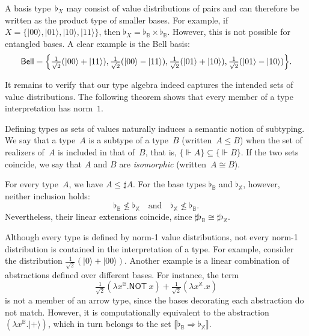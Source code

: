 \documentclass[runningheads,orivec,envcountsame,envcountsect]{llncs}
\providecommand{\qed}{\hbox{\rule{1ex}{1ex}}}%
\newcommand\ket[1]{\ensuremath{|#1\rangle}}
\def\Sph{\mathcal{S}_1}       %
\def\Lam#1#2#3{\lambda#1^{#2}{.}#3} %
\def\Arr{\Rightarrow}
\def\sem#1{\llbracket#1\rrbracket}
\def\real{\Vdash}
\newcommand\B{\mathbb B}
\newcommand\XB{\mathbb X}
\newcommand{\pauliX}[1]{\mathsf{NOT}\ #1}
\newcommand\basis[1]{\ensuremath{\flat_{#1}}}
\begin{document}
\begin{remark}
  A basis type~$\basis{X}$ may consist of value distributions of pairs and can
  therefore be written as the product type of smaller bases. For example, if
  $X=\{\ket{00},\ket{01},\ket{10},\ket{11}\}$, then $\basis{X}=\basis{\B}\times\basis{\B}$.
  However, this is not possible for entangled bases. A clear example is the
  Bell basis:
  \[
    \mathsf{Bell}
    =\Bigl\{
      \tfrac{1}{\sqrt{2}}(\ket{00}+\ket{11}),
      \tfrac{1}{\sqrt{2}}(\ket{00}-\ket{11}),
      \tfrac{1}{\sqrt{2}}(\ket{01}+\ket{10}),
      \tfrac{1}{\sqrt{2}}(\ket{01}-\ket{10})
    \Bigr\}.
  \]
\end{remark}

It remains to verify that our type algebra indeed captures the intended sets of
value distributions. The following theorem shows that every member of a type
interpretation has norm~$1$.


Defining types as sets of values naturally induces a semantic notion of
subtyping. We say that a type~$A$ is a subtype of a type~$B$
(written~$A\leq B$) when the set of realizers of~$A$ is included in that of~$B$,
that is, $\{\real A\}\subseteq\{\real B\}$.
If the two sets coincide, we say that $A$ and $B$ are \emph{isomorphic}
(written~$A\cong B$).

\begin{example}
  For every type~$A$, we have $A\leq\sharp A$.
  For the base types $\basis{\B}$ and $\basis{\XB}$, however,
  neither inclusion holds:
  \[
    \basis{\B}\not\leq\basis{\XB}
    \quad\text{and}\quad
    \basis{\XB}\not\leq\basis{\B}.
  \]
  Nevertheless, their linear extensions coincide,
  since $\sharp\basis{\B}\cong\sharp\basis{\XB}$.
\end{example}

Although every type is defined by norm-1 value distributions, not every
norm-1 distribution is contained in the interpretation of a type.
For example, consider the distribution
$\tfrac{1}{\sqrt{2}}(\ket{0} + \ket{00})$.
Another example is a linear combination of abstractions defined over different
bases. For instance, the term
\[
  \tfrac{1}{\sqrt{2}}(\Lam{x}{{\B}}{\pauliX{x}})
  + \tfrac{1}{\sqrt{2}}(\Lam{x}{{\XB}}{x})
\]
is not a member of an arrow type, since the bases decorating each abstraction
do not match. However, it is computationally equivalent to the abstraction
$(\Lam{x}{{\B}}{\ket{+}})$, which in turn belongs to the set
$\sem{\basis{\B}\Arr\basis{\XB}}$.
\end{document}
